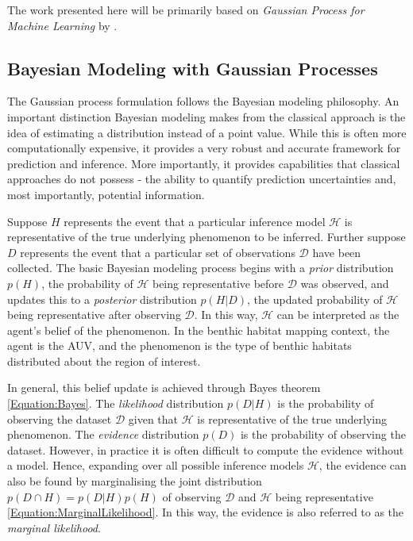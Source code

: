 		

		The work presented here will be primarily based on \textit{Gaussian Process for Machine Learning} by \cite{GaussianProcessForMachineLearning}. 

		\subsection{Bayesian Modeling with Gaussian Processes}
		
			The Gaussian process formulation follows the Bayesian modeling philosophy. An important distinction Bayesian modeling makes from the classical approach is the idea of estimating a distribution instead of a point value. While this is often more computationally expensive, it provides a very robust and accurate framework for prediction and inference. More importantly, it provides capabilities that classical approaches do not possess - the ability to quantify prediction uncertainties and, most importantly, potential information. 
			
			Suppose $H$ represents the event that a particular inference model $\mathcal{H}$ is representative of the true underlying phenomenon to be inferred. Further suppose $D$ represents the event that a particular set of observations $\mathcal{D}$ have been collected. The basic Bayesian modeling process begins with a \textit{prior} distribution $p(H)$, the probability of $\mathcal{H}$ being representative before $\mathcal{D}$ was observed, and updates this to a \textit{posterior} distribution $p(H | D)$, the updated probability of $\mathcal{H}$ being representative after observing $\mathcal{D}$. In this way, $\mathcal{H}$ can be interpreted as the agent's belief of the phenomenon. In the benthic habitat mapping context, the agent is the AUV, and the phenomenon is the type of benthic habitats distributed about the region of interest.
			
			In general, this belief update is achieved through Bayes theorem \eqref{Equation:Bayes}. The \textit{likelihood} distribution $p(D | H)$ is the probability of observing the dataset $\mathcal{D}$ given that $\mathcal{H}$ is representative of the true underlying phenomenon. The \textit{evidence} distribution $p(D)$ is the probability of observing the dataset. However, in practice it is often difficult to compute the evidence without a model. Hence, expanding over all possible inference models $\mathcal{H}$, the evidence can also be found by marginalising the joint distribution $p(D \cap H) = p(D | H) p(H)$ of observing $\mathcal{D}$ and $\mathcal{H}$ being representative \eqref{Equation:MarginalLikelihood}. In this way, the evidence is also referred to as the \textit{marginal likelihood}.
			
